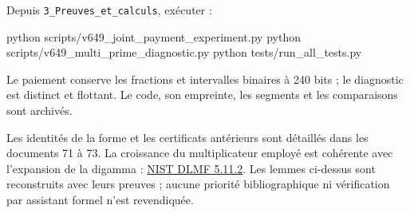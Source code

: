 \documentclass[
  10pt,
  a4paper,
]{article}
\newenvironment{Shaded}{}{}
\newcommand{\NormalTok}[1]{#1}
\begin{document}
Depuis \texttt{3\_Preuves\_et\_calculs}, exécuter :

\begin{Shaded}
\begin{Highlighting}[]
\NormalTok{python scripts/v649\_joint\_payment\_experiment.py}
\NormalTok{python scripts/v649\_multi\_prime\_diagnostic.py}
\NormalTok{python tests/run\_all\_tests.py}
\end{Highlighting}
\end{Shaded}

Le paiement conserve les fractions et intervalles binaires à 240 bits ;
le diagnostic est distinct et flottant. Le code, son empreinte, les
segments et les comparaisons sont archivés.

Les identités de la forme et les certificats antérieurs sont détaillés
dans les documents 71 à 73. La croissance du multiplicateur employé est
cohérente avec l'expansion de la digamma :
\href{https://dlmf.nist.gov/5.11\#E2}{NIST DLMF 5.11.2}. Les lemmes
ci-dessus sont reconstruits avec leurs preuves ; aucune priorité
bibliographique ni vérification par assistant formel n'est revendiquée.
\end{document}

